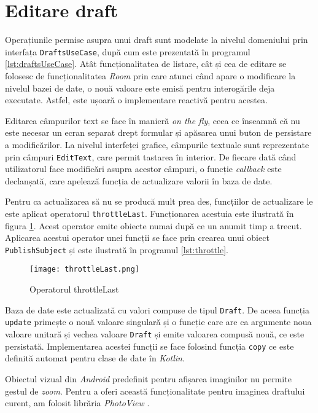 \section{Editare draft}

Operațiunile permise asupra unui draft sunt modelate la nivelul domeniului prin interfața \texttt{DraftsUseCase}, după cum este prezentată în programul \ref{lst:draftsUseCase}. Atât funcționalitatea de listare, cât și cea de editare se folosesc de funcționalitatea \emph{Room} prin care atunci când apare o modificare la nivelul bazei de date, o nouă valoare este emisă pentru interogările deja executate. Astfel, este ușoară o implementare reactivă pentru acestea.



Editarea câmpurilor text se face în manieră \emph{on the fly}, ceea ce înseamnă că nu este necesar un ecran separat drept formular și apăsarea unui buton de persistare a modificărilor. La nivelul interfeței grafice, câmpurile textuale sunt reprezentate prin câmpuri \texttt{EditText}, care permit tastarea în interior. De fiecare dată când utilizatorul face modificări asupra acestor câmpuri, o funcție \emph{callback} este declanșată, care apelează funcția de actualizare valorii în baza de date.

Pentru ca actualizarea să nu se producă mult prea des, funcțiilor de actualizare le este aplicat operatorul \texttt{throttleLast}. Funcționarea acestuia este ilustrată în figura \ref{fig:throttle}\cite{ThrottleLast}. Acest operator emite obiecte numai după ce un anumit timp a trecut. Aplicarea acestui operator unei funcții se face prin crearea unui obiect \texttt{PublishSubject} și este ilustrată în programul \ref{lst:throttle}.



\begin{figure}[ht]
  \centering
  \texttt{[image: throttleLast.png]}
  \caption{Operatorul throttleLast}
  \label{fig:throttle}
\end{figure}

Baza de date este actualizată cu valori compuse de tipul \texttt{Draft}. De aceea funcția \texttt{update} primește o nouă valoare singulară și o funcție care are ca argumente noua valoare unitară și vechea valoare \texttt{Draft} și emite valoarea compusă nouă, ce este persistată. Implementarea acestei funcții se face folosind funcția \texttt{copy} ce este definită automat pentru clase de date în \emph{Kotlin}.

Obiectul vizual din \emph{Android} predefinit pentru afișarea imaginilor  nu permite gestul de \emph{zoom}. Pentru a oferi această funcționalitate pentru imaginea draftului curent, am folosit librăria \emph{PhotoView} \cite{PhotoView}. 

